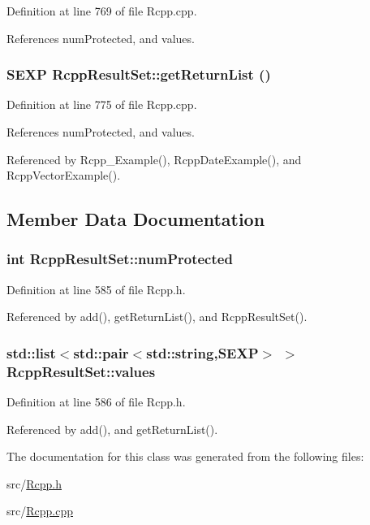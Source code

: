 Definition at line 769 of file Rcpp.cpp.

References numProtected, and values.\hypertarget{classRcppResultSet_916989ff6c0ed1149a5f93fb6a532946}{
\subsubsection[getReturnList]{\setlength{\rightskip}{0pt plus 5cm}SEXP RcppResultSet::getReturnList ()}}
\label{classRcppResultSet_916989ff6c0ed1149a5f93fb6a532946}




Definition at line 775 of file Rcpp.cpp.

References numProtected, and values.

Referenced by Rcpp\_\-Example(), RcppDateExample(), and RcppVectorExample().

\subsection{Member Data Documentation}
\hypertarget{classRcppResultSet_19edd02ac05783f9b4fd840c22e74153}{
\subsubsection[numProtected]{\setlength{\rightskip}{0pt plus 5cm}int {\bf RcppResultSet::numProtected}}}
\label{classRcppResultSet_19edd02ac05783f9b4fd840c22e74153}




Definition at line 585 of file Rcpp.h.

Referenced by add(), getReturnList(), and RcppResultSet().\hypertarget{classRcppResultSet_509f3d779c88476dea89ade9c08d403f}{
\subsubsection[values]{\setlength{\rightskip}{0pt plus 5cm}std::list$<$std::pair$<$std::string,SEXP$>$ $>$ {\bf RcppResultSet::values}}}
\label{classRcppResultSet_509f3d779c88476dea89ade9c08d403f}




Definition at line 586 of file Rcpp.h.

Referenced by add(), and getReturnList().

The documentation for this class was generated from the following files:\begin{CompactItemize}
\item 
src/\hyperlink{Rcpp_8h}{Rcpp.h}\item 
src/\hyperlink{Rcpp_8cpp}{Rcpp.cpp}\end{CompactItemize}
